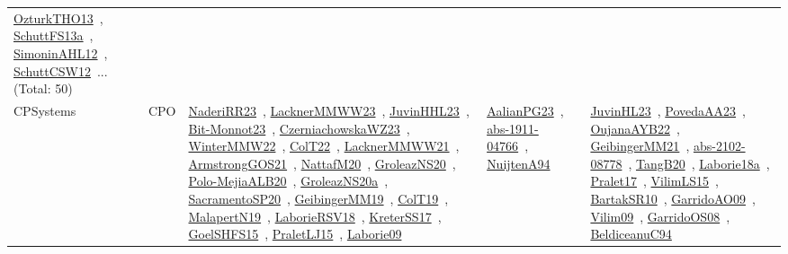 {\begin{longtable}{lp{3cm}>{\raggedright\arraybackslash}p{6cm}>{\raggedright\arraybackslash}p{6cm}>{\raggedright\arraybackslash}p{8cm}}
\href{works/OzturkTHO13.pdf}{OzturkTHO13}~\cite{OzturkTHO13}, \href{works/SchuttFS13a.pdf}{SchuttFS13a}~\cite{SchuttFS13a}, \href{works/SimoninAHL12.pdf}{SimoninAHL12}~\cite{SimoninAHL12}, \href{works/SchuttCSW12.pdf}{SchuttCSW12}~\cite{SchuttCSW12}... (Total: 50)\\
CPSystems & CPO & \href{works/NaderiRR23.pdf}{NaderiRR23}~\cite{NaderiRR23}, \href{works/LacknerMMWW23.pdf}{LacknerMMWW23}~\cite{LacknerMMWW23}, \href{works/JuvinHHL23.pdf}{JuvinHHL23}~\cite{JuvinHHL23}, \href{works/Bit-Monnot23.pdf}{Bit-Monnot23}~\cite{Bit-Monnot23}, \href{works/CzerniachowskaWZ23.pdf}{CzerniachowskaWZ23}~\cite{CzerniachowskaWZ23}, \href{works/WinterMMW22.pdf}{WinterMMW22}~\cite{WinterMMW22}, \href{works/ColT22.pdf}{ColT22}~\cite{ColT22}, \href{works/LacknerMMWW21.pdf}{LacknerMMWW21}~\cite{LacknerMMWW21}, \href{works/ArmstrongGOS21.pdf}{ArmstrongGOS21}~\cite{ArmstrongGOS21}, \href{works/NattafM20.pdf}{NattafM20}~\cite{NattafM20}, \href{works/GroleazNS20.pdf}{GroleazNS20}~\cite{GroleazNS20}, \href{works/Polo-MejiaALB20.pdf}{Polo-MejiaALB20}~\cite{Polo-MejiaALB20}, \href{works/GroleazNS20a.pdf}{GroleazNS20a}~\cite{GroleazNS20a}, \href{works/SacramentoSP20.pdf}{SacramentoSP20}~\cite{SacramentoSP20}, \href{works/GeibingerMM19.pdf}{GeibingerMM19}~\cite{GeibingerMM19}, \href{works/ColT19.pdf}{ColT19}~\cite{ColT19}, \href{works/MalapertN19.pdf}{MalapertN19}~\cite{MalapertN19}, \href{works/LaborieRSV18.pdf}{LaborieRSV18}~\cite{LaborieRSV18}, \href{works/KreterSS17.pdf}{KreterSS17}~\cite{KreterSS17}, \href{works/GoelSHFS15.pdf}{GoelSHFS15}~\cite{GoelSHFS15}, \href{works/PraletLJ15.pdf}{PraletLJ15}~\cite{PraletLJ15}, \href{works/Laborie09.pdf}{Laborie09}~\cite{Laborie09} & \href{works/AalianPG23.pdf}{AalianPG23}~\cite{AalianPG23}, \href{works/abs-1911-04766.pdf}{abs-1911-04766}~\cite{abs-1911-04766}, \href{works/NuijtenA94.pdf}{NuijtenA94}~\cite{NuijtenA94} & \href{works/JuvinHL23.pdf}{JuvinHL23}~\cite{JuvinHL23}, \href{works/PovedaAA23.pdf}{PovedaAA23}~\cite{PovedaAA23}, \href{works/OujanaAYB22.pdf}{OujanaAYB22}~\cite{OujanaAYB22}, \href{works/GeibingerMM21.pdf}{GeibingerMM21}~\cite{GeibingerMM21}, \href{works/abs-2102-08778.pdf}{abs-2102-08778}~\cite{abs-2102-08778}, \href{works/TangB20.pdf}{TangB20}~\cite{TangB20}, \href{works/Laborie18a.pdf}{Laborie18a}~\cite{Laborie18a}, \href{works/Pralet17.pdf}{Pralet17}~\cite{Pralet17}, \href{works/VilimLS15.pdf}{VilimLS15}~\cite{VilimLS15}, \href{works/BartakSR10.pdf}{BartakSR10}~\cite{BartakSR10}, \href{works/GarridoAO09.pdf}{GarridoAO09}~\cite{GarridoAO09}, \href{works/Vilim09.pdf}{Vilim09}~\cite{Vilim09}, \href{works/GarridoOS08.pdf}{GarridoOS08}~\cite{GarridoOS08}, \href{works/BeldiceanuC94.pdf}{BeldiceanuC94}~\cite{BeldiceanuC94}\\

\end{longtable}}
